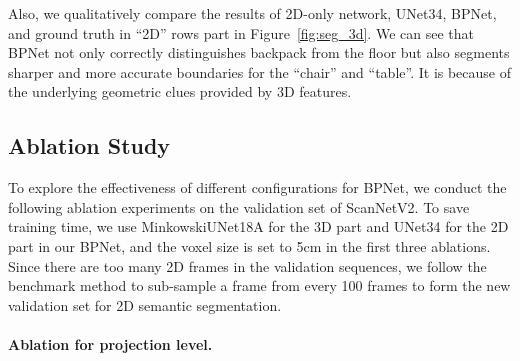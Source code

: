\documentclass[final]{cvpr}
\begin{document}
Also, we qualitatively compare the results of 2D-only network, UNet34, BPNet, and ground truth in ``2D'' rows part in Figure~\ref{fig:seg_3d}.
We can see that BPNet not only correctly distinguishes backpack from the floor but also segments sharper and more accurate boundaries for the ``chair'' and ``table''.
It is because of the underlying geometric clues provided by 3D features.



\subsection{Ablation Study}
To explore the effectiveness of different configurations for BPNet, we conduct the following ablation experiments on the validation set of ScanNetV2.
To save training time, we use MinkowskiUNet18A for the 3D part and UNet34 for the 2D part in our BPNet, and the voxel size is set to 5cm in the first three ablations.
Since there are too many 2D frames in the validation sequences, we follow the benchmark method to sub-sample a frame from every 100 frames to form the new validation set for 2D semantic segmentation.




\vspace{-4mm}
\paragraph{Ablation for projection level.}
\end{document}
